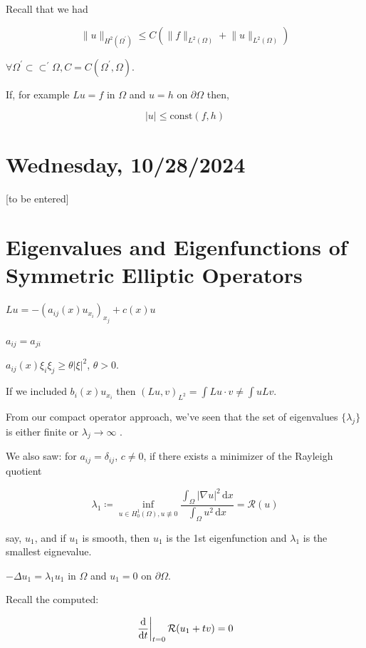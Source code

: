 \documentclass{article}
\theoremstyle{definition}
\begin{document}
Recall that we had

\[
    \lVert u \rVert _{H^2(\Omega^{\prime})} \leq C \left( \lVert f \rVert _{L^2(\Omega)} + \lVert u \rVert _{L^2(\Omega)} \right) 
\]

\(\forall \Omega ^{\prime} \subset \subset ^{\prime} \Omega, C = C(\Omega ^{\prime} , \Omega)\).

If, for example \(L u = f\) in \(\Omega\) and \(u = h\) on \(\partial \Omega\) then,

\[
    \vert u \vert \leq \text{const}(f,h)
\]

\section*{Wednesday, 10/28/2024}

[to be entered]

\section*{Eigenvalues and Eigenfunctions of Symmetric Elliptic Operators}

\(Lu = - (a_{ij} (x) u_{x_i})_{x_j} + c(x) u\)

\(a_{ij} = a_{ji} \)

\(a_{ij} (x) \xi _i \xi _j \geq \theta \vert \xi \vert  ^{2}\), \(\theta > 0\).

If we included \(b_i(x) u_{x_i} \) then \((Lu, v) _{L^2} = \int Lu \cdot v \neq \int u L v\).

From our compact operator approach, we've seen that the set of eigenvalues \(\{ \lambda_j \} \) is either finite or \(\lambda _j \to \infty \) .

We also saw: for \(a_{ij} = \delta _{ij}\), \(c \neq 0\), if there exists a minimizer of the Rayleigh quotient

\[
    \lambda_1 \coloneqq \inf_{u\in H^1_0(\Omega), u \not\equiv 0} \frac{\int_{\Omega} \vert \nabla u \vert ^2 \,\mathrm{d}x }{\int_{\Omega} u^2 \,\mathrm{d}x } = \mathcal{R} (u)
\]

say, \(u_1\), and if \(u_1\) is smooth, then \(u_1\) is the 1st eigenfunction and \(\lambda_1\) is the smallest eignevalue.

\(- \Delta u_1 = \lambda _1 u_1\) in \(\Omega\) and \(u_1 = 0\) on \(\partial \Omega\).

Recall the computed:

\[
    \eval{\frac{\mathrm{d}}{\mathrm{d}t}}_{t=0} \mathcal{R}(u_1+tv) = 0
\]
\end{document}
